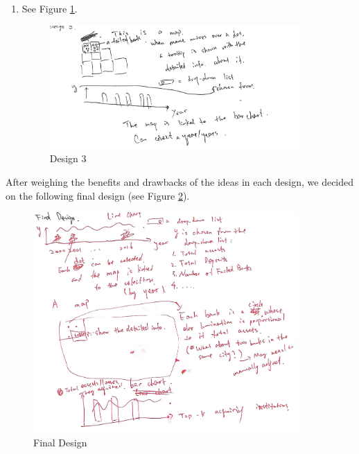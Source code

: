 \documentclass[11pt]{article}
\begin{document}
\begin{enumerate}
    \item See Figure \ref{fig:design_3}.
        
        \begin{figure}[!h]
            \centering
            \includegraphics[width=0.9\textwidth]{fig/design_3}
            \caption{Design 3}
            \label{fig:design_3}
        \end{figure}
\end{enumerate}

After weighing the benefits and drawbacks of the ideas in each design, we
decided on the following final design (see Figure \ref{fig:final_design}).

\begin{figure}[!h]
    \centering
    \includegraphics[width=0.9\textwidth]{fig/final_design}
    \caption{Final Design}
    \label{fig:final_design}
\end{figure}
\end{document}
